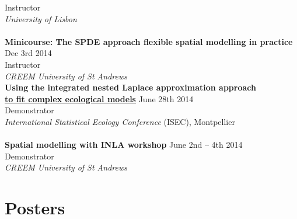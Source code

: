 \documentclass[10pt,letter]{article}
\begin{document}
 Instructor\\
 {\sl University of Lisbon}\\
 \hdashrule[0.5ex]{4cm}{1pt}{1pt}\\
  {\textbf{{Minicourse: The SPDE approach flexible spatial modelling in practice}}} \hfill Dec 3rd  2014\\
 Instructor\\
 {\sl CREEM University of St Andrews}\\ 
 \newpage
\noindent
{{\textbf {Using the integrated nested Laplace approximation approach}}} \\ {\href{http://www.r-inla.org/events/inlacourseatisec2014}{\textbf{to fit complex ecological models}}}  \hfill June 28th 2014\\
 Demonstrator\\
 {\sl International Statistical Ecology Conference} (ISEC), Montpellier\\
 \hdashrule[0.5ex]{4cm}{1pt}{1pt}\\
{\textbf{{Spatial modelling with INLA workshop}}} \hfill June 2nd – 4th  2014\\
 Demonstrator\\
 {\sl CREEM University of St Andrews}\\ 
 


 \vspace{-1mm}

\section*{Posters}
\vspace{1mm}
\end{document}
